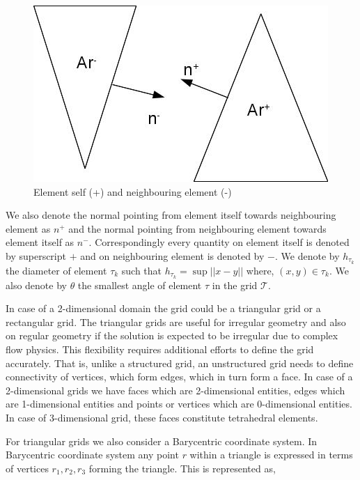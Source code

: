 \documentclass[a4paper,12pt]{book}
\begin{document}
\begin{figure}
\centering
  \includegraphics[width=\linewidth]{ch_3_fig_1.jpg}
  \caption{Element self (+) and neighbouring element (-)}
  \label{fig:Self_neighbour}
\end{figure}

We also denote the normal pointing from element itself towards neighbouring element as $n^+$ and the normal pointing from neighbouring element towards element itself as $n^-$. Correspondingly every quantity on element itself is denoted by superscript $+$ and on neighbouring element is denoted by $-$.  We denote by $h_{\tau_k}$ the diameter of element $\tau_k$ such that $h_{\tau_k} = \sup ||x-y||$ where, $(x,y) \in \tau_k$. We also denote by $\theta$ the smallest angle of element $\tau$ in the grid $\mathcal{T}$.

In case of a 2-dimensional domain the grid could be a triangular grid or a rectangular grid. The triangular grids are useful for irregular geometry and also on regular geometry if the solution is expected to be irregular due to complex flow physics. This flexibility requires additional efforts to define the grid accurately. That is, unlike a structured grid, an unstructured grid needs to define connectivity of vertices, which form edges, which in turn form a face. In case of a 2-dimensional grids we have faces which are 2-dimensional entities, edges which are 1-dimensional entities and points or vertices which are 0-dimensional entities. In case of 3-dimensional grid, these faces constitute tetrahedral elements. 

For triangular grids we also consider a Barycentric coordinate system. In Barycentric coordinate system any point $r$ within a triangle is expressed in terms of vertices $r_1,r_2,r_3$ forming the triangle. This is represented as,
\end{document}
